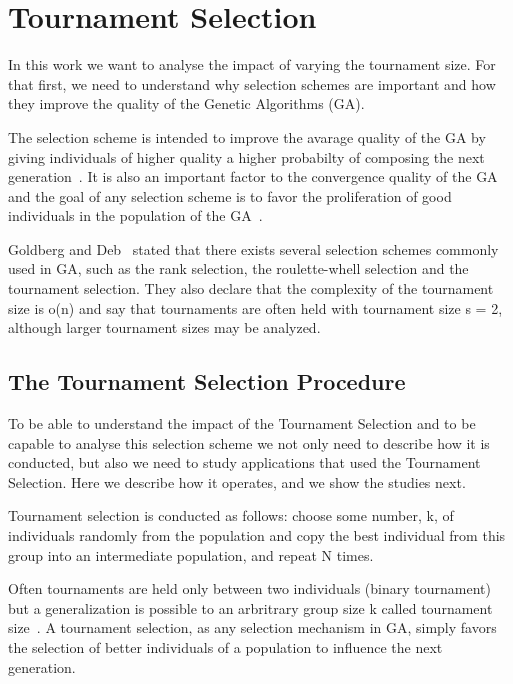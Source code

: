 \section{Tournament Selection}\label{sec:background:Selection Scheme} 

In this work we want to analyse the impact of varying the tournament size. For that first, we need to understand why selection schemes are important and how they improve the quality of the Genetic Algorithms (GA).

The selection scheme is intended to improve the avarage quality of the GA by giving individuals of higher quality a higher probabilty of composing the next generation~\cite{blickle1995mathematical}. It is also an important factor to the convergence quality of the GA and the goal of any selection scheme is to favor the proliferation of good individuals in the population of the GA~\cite{harik1999gambler}. 

Goldberg and Deb~\cite{goldberg1991comparative} stated that there exists several selection schemes commonly used in GA, such as the rank selection, the roulette-whell selection and the tournament selection. They also declare that the complexity of the tournament size is o(n) and say that tournaments are often held with tournament size s = 2, although larger tournament sizes may be analyzed.

\subsection{The Tournament Selection Procedure}\label{sec:background:tournament_selection} 

To be able to understand the impact of the Tournament Selection and to be capable to analyse this selection scheme we not only need to describe how it is conducted, but also we need to study applications that used the Tournament Selection. Here we describe how it operates, and we show the studies next.

Tournament selection is conducted as follows: choose some number, k, of individuals randomly from the population and copy the best individual from this group into an intermediate population, and repeat N times. 

Often tournaments are held only between two individuals (binary tournament) but a generalization is possible to an arbritrary group size k called tournament size~\cite{blickle1995mathematical, goldberg1991comparative}. A tournament selection, as any selection mechanism in GA, simply favors the selection of better individuals of a population to influence the next generation. 


